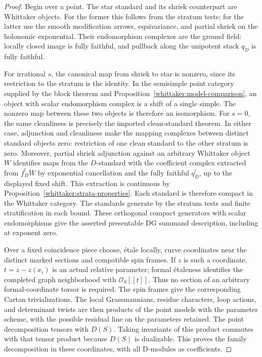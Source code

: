 \begin{proof}
Begin over a point. The star standard and its shriek counterpart are
Whittaker objects. For the former this follows from the stratum tests;
for the latter use the smooth modification arrows, equivariance, and
partial shriek on the holonomic exponential. Their endomorphism
complexes are the ground field: locally closed image is fully faithful,
and pullback along the unipotent stack $q_D$ is fully faithful.

For irrational $s$, the canonical map from shriek to star is nonzero,
since its restriction to the stratum is the identity. In the semisimple
point category supplied by the block theorem and
Proposition~\ref{whittaker:model-comparison}, an object with scalar
endomorphism complex is a shift of a single simple. The nonzero map
between these two objects is therefore an isomorphism. For $s=0$, the
same cleanliness is precisely the imported clean-standard theorem.
In either case, adjunction and cleanliness make the mapping complexes
between distinct standard objects zero: restriction of one clean
standard to the other stratum is zero. Moreover, partial shriek
adjunction against an arbitrary Whittaker object $W$ identifies maps
from the $D$-standard with the coefficient complex extracted from
$f_D^!W$ by exponential cancellation and the fully faithful $q_D^!$,
up to the displayed fixed shift. This extraction is continuous by
Proposition~\ref{whittaker:strata-properties}. Each standard is therefore
compact in the Whittaker category. The standards generate by the stratum
tests and finite stratification in each bound. These orthogonal compact
generators with scalar endomorphisms give the asserted presentable DG
summand description, including at exponent zero.

Over a fixed coincidence piece choose, \'etale locally, curve coordinates
near the distinct marked sections and compatible spin frames. If $z$ is
such a coordinate, $t=z-z(x_i)$ is an actual relative parameter; formal
\'etaleness identifies the completed graph neighborhood with
$\mathcal O_S[[t]]$. Thus no section of an arbitrary formal-coordinate
torsor is required. The spin frames give the corresponding Cartan
trivializations. The local Grassmannians, residue
characters, loop actions, and determinant twists are then products of
the point models with the parameter scheme, with the possible residual
line on the parameters retained. The point decomposition tensors with
$D(S)$. Taking invariants of this product commutes with that tensor
product because $D(S)$ is dualizable. This proves the family decomposition
in these coordinates, with all D-modules as coefficients.


\end{proof}
